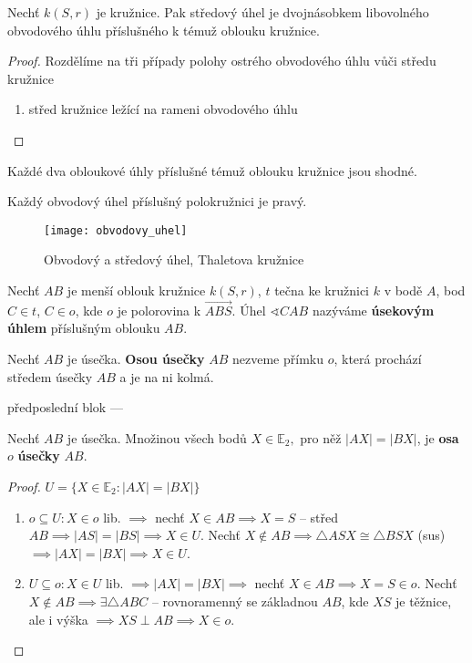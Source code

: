 \begin{veta}
  Nechť $k(S,r)$ je kružnice. Pak středový úhel je dvojnásobkem libovolného obvodového úhlu příslušného k témuž oblouku kružnice.
\end{veta}

\begin{proof}
  Rozdělíme na tři případy polohy ostrého obvodového úhlu vůči středu kružnice
  \begin{enumerate}
    \item střed kružnice ležící na rameni obvodového úhlu
  \end{enumerate}
\end{proof}

\begin{veta}
  Každé dva obloukové úhly příslušné témuž oblouku kružnice jsou shodné.
\end{veta}

\begin{veta}[Thaletova]
  Každý obvodový úhel příslušný polokružnici je pravý.
\end{veta}

\begin{figure}[ht!]
  \centering
  \texttt{[image: obvodovy\_uhel]}
  \caption{Obvodový a středový úhel, Thaletova kružnice}
\end{figure}

\begin{definition}
  Nechť $AB$ je menší oblouk kružnice $k(S,r)$, $t$ tečna ke kružnici $k$ v bodě $A$, bod $C\in t$, $C\in o$, kde $o$ je polorovina k $\overrightarrow{ABS}.$ Úhel $\sphericalangle CAB$ nazýváme \textbf{úsekovým úhlem} příslušným oblouku $AB$.
\end{definition}


\begin{definition}
  Nechť $AB$ je úsečka. \textbf{Osou úsečky} $AB$ nezveme přímku $o$, která prochází středem úsečky $AB$ a je na ni kolmá.
\end{definition}


předposlední blok ---
\begin{veta}\label{mbdv}
  Nechť $AB$ je úsečka. Množinou všech bodů $X\in \mathbb E_2,$ pro něž $|AX|=|BX|$, je \textbf{osa} $o$ \textbf{úsečky} $AB$.
\end{veta}

\begin{proof}
  $U=\{ X\in \mathbb E_2: |AX|=|BX| \}$
  \begin{enumerate}[$i.$]
    \item $o \subseteq U: X \in o$ lib. $\implies$ nechť $X\in AB \implies X=S$ -- střed $AB \implies |AS|=|BS| \implies X \in U.$ Nechť $X \notin AB \implies \triangle ASX \cong \triangle BSX$ (sus) $\implies |AX|=|BX| \implies X \in U$.
    \item $U \subseteq o: X \in U$ lib. $\implies |AX|=|BX| \implies$ nechť $X \in AB \implies X=S \in o.$ Nechť $X \notin AB \implies \exists \triangle ABC$ -- rovnoramenný se základnou $AB$, kde $XS$ je těžnice, ale i výška $\implies XS \perp AB \implies X \in o.$ \qedhere
  \end{enumerate}
\end{proof}

